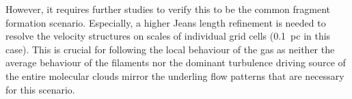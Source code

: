 However, it requires further studies to verify this to be the common fragment formation scenario. 
Especially, a higher Jeans length refinement is needed to resolve the velocity structures on scales of individual grid cells (0.1~pc in this case).
This is crucial for following the local behaviour of the gas as neither the average behaviour of the filaments nor the dominant turbulence driving source of the entire molecular clouds mirror the underling flow patterns that are necessary for this scenario. 



\endinput
